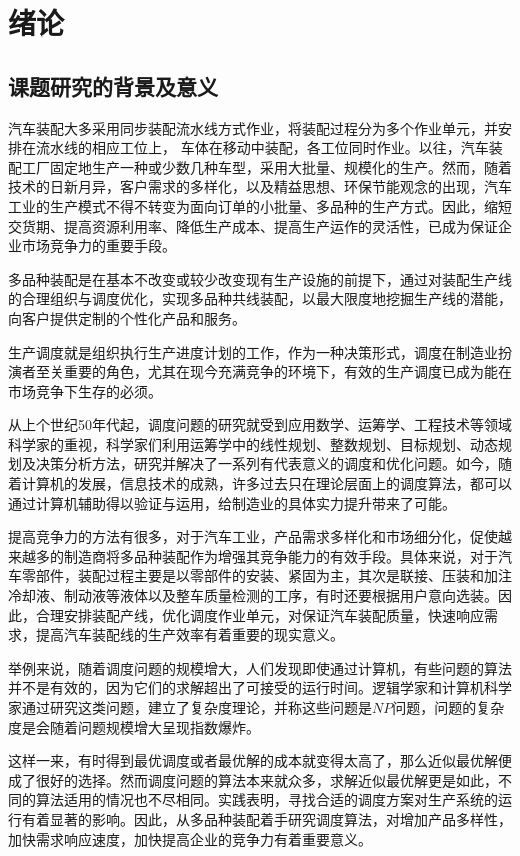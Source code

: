 \chapter{绪论}
\section{课题研究的背景及意义}

汽车装配大多采用同步装配流水线方式作业，将装配过程分为多个作业单元，并安排在流水线的相应工位上，
车体在移动中装配，各工位同时作业。以往，汽车装配工厂固定地生产一种或少数几种车型，采用大批量、规模化的生产。然而，随着技术的日新月异，客户需求的多样化，以及精益思想、环保节能观念的出现，汽车工业的生产模式不得不转变为面向订单的小批量、多品种的生产方式。因此，缩短交货期、提高资源利用率、降低生产成本、提高生产运作的灵活性，已成为保证企业市场竞争力的重要手段。

多品种装配是在基本不改变或较少改变现有生产设施的前提下，通过对装配生产线的合理组织与调度优化，实现多品种共线装配，以最大限度地挖掘生产线的潜能，向客户提供定制的个性化产品和服务。

生产调度就是组织执行生产进度计划的工作，作为一种决策形式，调度在制造业扮演者至关重要的角色，尤其在现今充满竞争的环境下，有效的生产调度已成为能在市场竞争下生存的必须。

从上个世纪50年代起，调度问题的研究就受到应用数学、运筹学、工程技术等领域科学家的重视，科学家们利用运筹学中的线性规划、整数规划、目标规划、动态规划及决策分析方法，研究并解决了一系列有代表意义的调度和优化问题\cite{徐俊刚2004}。如今，随着计算机的发展，信息技术的成熟，许多过去只在理论层面上的调度算法，都可以通过计算机辅助得以验证与运用，给制造业的具体实力提升带来了可能。

提高竞争力的方法有很多，对于汽车工业，产品需求多样化和市场细分化，促使越来越多的制造商将多品种装配作为增强其竞争能力的有效手段。具体来说，对于汽车零部件，装配过程主要是以零部件的安装、紧固为主，其次是联接、压装和加注冷却液、制动液等液体以及整车质量检测的工序，有时还要根据用户意向选装。因此，合理安排装配产线，优化调度作业单元，对保证汽车装配质量，快速响应需求，提高汽车装配线的生产效率有着重要的现实意义。

举例来说，随着调度问题的规模增大，人们发现即使通过计算机，有些问题的算法并不是有效的，因为它们的求解超出了可接受的运行时间。逻辑学家和计算机科学家通过研究这类问题，建立了复杂度理论，并称这些问题是$NP$问题，问题的复杂度是会随着问题规模增大呈现指数爆炸。

这样一来，有时得到最优调度或者最优解的成本就变得太高了，那么近似最优解便成了很好的选择。然而调度问题的算法本来就众多，求解近似最优解更是如此，不同的算法适用的情况也不尽相同。实践表明，寻找合适的调度方案对生产系统的运行有着显著的影响。因此，从多品种装配着手研究调度算法，对增加产品多样性，加快需求响应速度，加快提高企业的竞争力有着重要意义。


